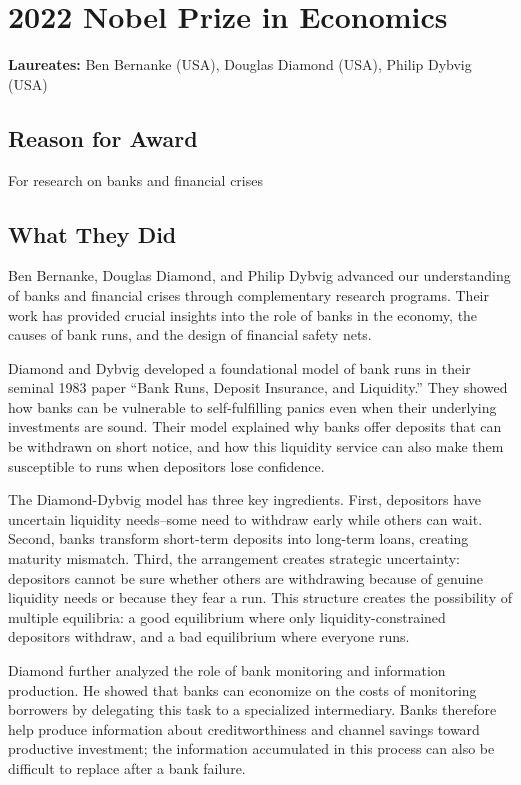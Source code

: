 \chapter{2022 Nobel Prize in Economics}
\textbf{Laureates: }Ben Bernanke (USA), Douglas Diamond (USA), Philip Dybvig (USA)

\section*{Reason for Award}
For research on banks and financial crises

\section{What They Did}
Ben Bernanke, Douglas Diamond, and Philip Dybvig advanced our understanding of banks and
financial crises through complementary research programs. Their work has provided crucial
insights into the role of banks in the economy, the causes of bank runs, and the design of
financial safety nets.

Diamond and Dybvig developed a foundational model of bank runs in their seminal 1983
paper ``Bank Runs, Deposit Insurance, and Liquidity.'' They showed how banks can be vulnerable
to self-fulfilling panics even when their underlying investments are sound. Their model
explained why banks offer deposits that can be withdrawn on short notice, and how this
liquidity service can also make them susceptible to runs when depositors lose confidence.

The Diamond-Dybvig model has three key ingredients. First, depositors have uncertain
liquidity needs--some need to withdraw early while others can wait. Second, banks transform
short-term deposits into long-term loans, creating maturity mismatch. Third, the arrangement
creates strategic uncertainty: depositors cannot be sure whether others are
withdrawing because of genuine liquidity needs or because they fear a run. This structure
creates the possibility of multiple equilibria: a good equilibrium where only
liquidity-constrained depositors withdraw, and a bad equilibrium where everyone runs.

Diamond further analyzed the role of bank monitoring and information production. He showed
that banks can economize on the costs of monitoring borrowers by delegating this task to a
specialized intermediary. Banks therefore help produce information about creditworthiness and
channel savings toward productive investment; the information accumulated in this process can
also be difficult to replace after a bank failure.


